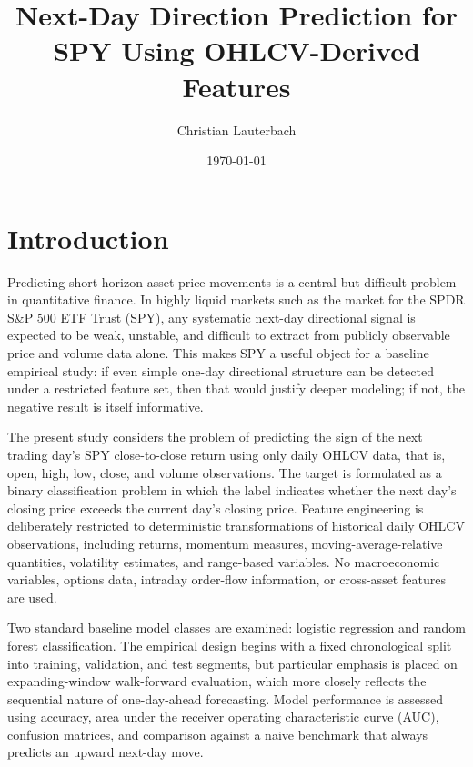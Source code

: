 \documentclass[11pt,a4paper]{article}
\title{Next-Day Direction Prediction for SPY Using OHLCV-Derived Features}
\author{Christian Lauterbach}
\date{\today}
\begin{document}
	
	\maketitle
	\tableofcontents
	\newpage
	
	\setlength{\parindent}{0pt}
	\setlength{\parskip}{0.8em}
	
	\section{Introduction}

	
	Predicting short-horizon asset price movements is a central but difficult problem in quantitative finance. In highly liquid markets such as the market for the SPDR S\&P 500 ETF Trust (SPY), any systematic next-day directional signal is expected to be weak, unstable, and difficult to extract from publicly observable price and volume data alone. This makes SPY a useful object for a baseline empirical study: if even simple one-day directional structure can be detected under a restricted feature set, then that would justify deeper modeling; if not, the negative result is itself informative.
	
	The present study considers the problem of predicting the sign of the next trading day's SPY close-to-close return using only daily OHLCV data, that is, open, high, low, close, and volume observations. The target is formulated as a binary classification problem in which the label indicates whether the next day's closing price exceeds the current day's closing price. Feature engineering is deliberately restricted to deterministic transformations of historical daily OHLCV observations, including returns, momentum measures, moving-average-relative quantities, volatility estimates, and range-based variables. No macroeconomic variables, options data, intraday order-flow information, or cross-asset features are used.
	
	Two standard baseline model classes are examined: logistic regression and random forest classification. The empirical design begins with a fixed chronological split into training, validation, and test segments, but particular emphasis is placed on expanding-window walk-forward evaluation, which more closely reflects the sequential nature of one-day-ahead forecasting. Model performance is assessed using accuracy, area under the receiver operating characteristic curve (AUC), confusion matrices, and comparison against a naive benchmark that always predicts an upward next-day move.
	
\end{document}

